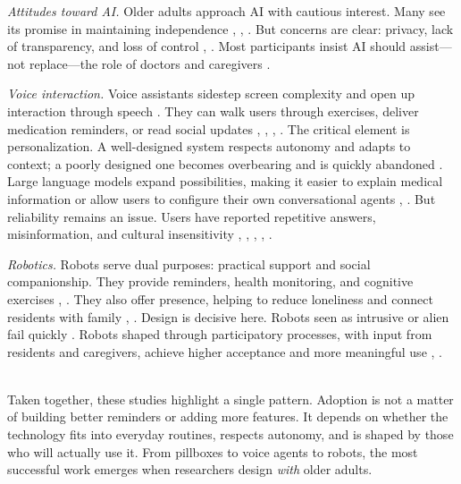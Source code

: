 \documentclass[acmlarge]{acmart}
\begin{document}
\emph{Attitudes toward AI.} Older adults approach AI with cautious
interest. Many see its promise in maintaining independence \cite{10.1145/3706599.3720033}, \cite{10.1145/3565698.3565774},
\cite{info:doi/10.2196/66778}. But concerns are clear: privacy, lack of transparency, and loss
of control \cite{10.1145/3565698.3565774}, \cite{info:doi/10.2196/65776}. Most participants insist AI should assist---not
replace---the role of doctors and caregivers \cite{info:doi/10.2196/66778}.

\emph{Voice interaction.} Voice assistants sidestep screen complexity
and open up interaction through speech \cite{10.1145/3623809.3623827}. They can walk users
through exercises, deliver medication reminders, or read social updates
\cite{info:doi/10.2196/26361}, \cite{10.1145/3623809.3623827}, \cite{10.1145/3517428.3544830}, \cite{10.1007/978-3-031-24667-8_7}. The critical element is personalization. A
well-designed system respects autonomy and adapts to context; a poorly
designed one becomes overbearing and is quickly abandoned \cite{10.1145/3706598.3713839}.
Large language models expand possibilities, making it easier to explain
medical information or allow users to configure their own conversational
agents \cite{10.1145/3706598.3714219}, \cite{10.1145/3706598.3713839}. But reliability remains an issue. Users have
reported repetitive answers, misinformation, and cultural insensitivity
\cite{Enam24032025}, \cite{10.1007/s10514-025-10190-y}, \cite{10.1007/978-3-031-91760-8_6}, \cite{10.1145/3712275}, \cite{10.1145/3700794.3700803}.

\emph{Robotics.} Robots serve dual purposes: practical support and
social companionship. They provide reminders, health monitoring, and
cognitive exercises \cite{10.1145/3533726}, \cite{10.1145/3706599.3719760}. They also offer presence, helping to
reduce loneliness and connect residents with family \cite{10.1145/3638380.3638412}, \cite{10.1145/3610978.3638378}. Design
is decisive here. Robots seen as intrusive or alien fail quickly
\cite{10.1145/3711936}. Robots shaped through participatory processes, with input from
residents and caregivers, achieve higher acceptance and more meaningful
use \cite{10.1145/3533726}, \cite{10.1145/3544548.3580893}.

\textbf{\\
} Taken together, these studies highlight a single pattern. Adoption is
not a matter of building better reminders or adding more features. It
depends on whether the technology fits into everyday routines, respects
autonomy, and is shaped by those who will actually use it. From
pillboxes to voice agents to robots, the most successful work emerges
when researchers design \emph{with} older adults.
\end{document}
